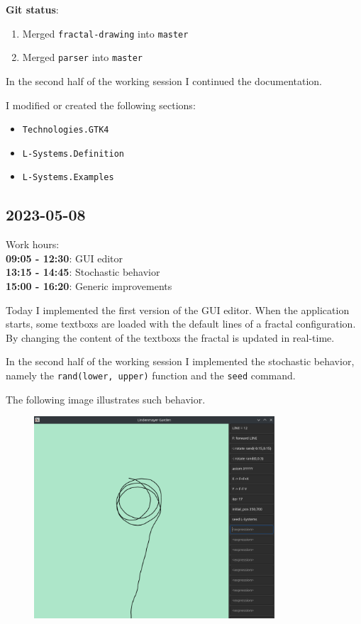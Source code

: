 \documentclass{article}
\begin{document}
\textbf{Git status}:
\begin{enumerate}
    \item Merged \texttt{fractal-drawing} into \texttt{master}
    \item Merged \texttt{parser} into \texttt{master}
\end{enumerate}

In the second half of the working session I continued the documentation.

I modified or created the following sections:
\begin{itemize}
    \item \texttt{Technologies.GTK4}
    \item \texttt{L-Systems.Definition}
    \item \texttt{L-Systems.Examples}
\end{itemize}

\pagebreak

\subsection{2023-05-08}

Work hours:\\
\textbf{09:05 - 12:30}: GUI editor \\
\textbf{13:15 - 14:45}: Stochastic behavior \\
\textbf{15:00 - 16:20}: Generic improvements

Today I implemented the first version of the GUI editor.
When the application starts, some textboxs are loaded
with the default lines of a fractal configuration.
By changing the content of the textboxs the fractal is updated in real-time.

In the second half of the working session I implemented
the stochastic behavior, namely the \texttt{rand(lower, upper)} function
and the \texttt{seed} command.

The following image illustrates such behavior.

\begin{center}
    \begin{figure}[h]
        \includegraphics[width=0.8\textwidth]{fractal_rand.png}
    \end{figure}
\end{center}
\end{document}

